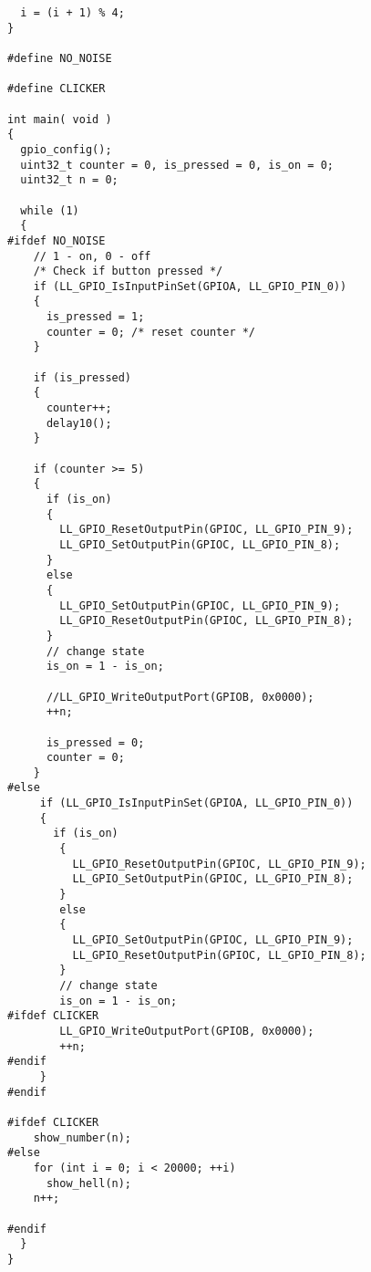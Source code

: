 \begin{verbatim}
  i = (i + 1) % 4;
}

#define NO_NOISE

#define CLICKER

int main( void )
{ 
  gpio_config();
  uint32_t counter = 0, is_pressed = 0, is_on = 0;
  uint32_t n = 0;
  
  while (1)
  {
#ifdef NO_NOISE
    // 1 - on, 0 - off
    /* Check if button pressed */
    if (LL_GPIO_IsInputPinSet(GPIOA, LL_GPIO_PIN_0))
    {
      is_pressed = 1; 
      counter = 0; /* reset counter */
    }
   
    if (is_pressed)
    {
      counter++;
      delay10();
    }
    
    if (counter >= 5)
    {
      if (is_on)
      {
        LL_GPIO_ResetOutputPin(GPIOC, LL_GPIO_PIN_9);
        LL_GPIO_SetOutputPin(GPIOC, LL_GPIO_PIN_8);
      }
      else
      {
        LL_GPIO_SetOutputPin(GPIOC, LL_GPIO_PIN_9);
        LL_GPIO_ResetOutputPin(GPIOC, LL_GPIO_PIN_8);
      }
      // change state
      is_on = 1 - is_on;
    
      //LL_GPIO_WriteOutputPort(GPIOB, 0x0000);
      ++n;
      
      is_pressed = 0;
      counter = 0;
    }
#else
     if (LL_GPIO_IsInputPinSet(GPIOA, LL_GPIO_PIN_0)) 
     {
       if (is_on)
        {
          LL_GPIO_ResetOutputPin(GPIOC, LL_GPIO_PIN_9);
          LL_GPIO_SetOutputPin(GPIOC, LL_GPIO_PIN_8);
        }
        else
        {
          LL_GPIO_SetOutputPin(GPIOC, LL_GPIO_PIN_9);
          LL_GPIO_ResetOutputPin(GPIOC, LL_GPIO_PIN_8);
        }
        // change state
        is_on = 1 - is_on;
#ifdef CLICKER
        LL_GPIO_WriteOutputPort(GPIOB, 0x0000);
        ++n;
#endif
     }
#endif
    
#ifdef CLICKER
    show_number(n);
#else
    for (int i = 0; i < 20000; ++i)
      show_hell(n);
    n++;
    
#endif
  }
}

\end{verbatim}